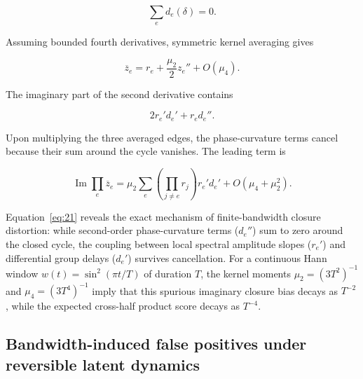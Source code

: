 \documentclass[aps,pre,reprint,amsmath,amssymb,superscriptaddress]{revtex4-2}
\begin{document}
\[
\sum_e d_e(\delta)=0.
\]

Assuming bounded fourth derivatives, symmetric kernel averaging gives

\[
\overline z_e
=
r_e+
\frac{\mu_2}{2}z_e''
+
O(\mu_4).
\]

The imaginary part of the second derivative contains

\[
2r_e'd_e'+r_ed_e''.
\]

Upon multiplying the three averaged edges, the phase-curvature terms cancel because their sum around the cycle vanishes. The leading term is

\begin{equation}\label{eq:21}
\boxed{
\operatorname{Im}
\prod_e\overline z_e
=
\mu_2
\sum_e
\left(
\prod_{j\ne e}r_j
\right)
r_e'd_e'
+
O(\mu_4+\mu_2^2).
}
\end{equation}

Equation~\eqref{eq:21} reveals the exact mechanism of finite-bandwidth closure distortion: while second-order phase-curvature terms ($d_e''$) sum to zero around the closed cycle, the coupling between local spectral amplitude slopes ($r_e'$) and differential group delays ($d_e'$) survives cancellation. For a continuous Hann window $w(t) = \sin^2(\pi t / T)$ of duration $T$, the kernel moments $\mu_2 = (3T^2)^{-1}$ and $\mu_4 = (3T^4)^{-1}$ imply that this spurious imaginary closure bias decays as $T^{-2}$, while the expected cross-half product score decays as $T^{-4}$.

\subsection{Bandwidth-induced false positives under reversible latent dynamics}
\end{document}
